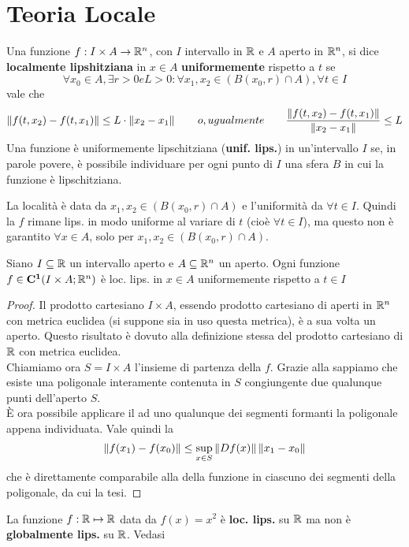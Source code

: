 \section{Teoria Locale}
\begin{definition}
	\label{def:loc_lips}
	Una funzione $f:I\times A\to \mathbb{R}^n$, con $I$ intervallo in $\mathbb{R}$ e $A$ aperto in $\mathbb{R}^n$, si dice \textbf{localmente lipshitziana} in $x\in A$ \textbf{uniformemente} rispetto a $t$ se
	$$\forall x_0 \in A, \exists r>0 e L>0: \forall x_1,x_2 \in (B(x_0,r)\cap A), \forall t\in I$$
	vale che
	$$\left\|f(t,x_2)-f(t,x_1)\right\|\leq L\cdot\left\|x_2-x_1\right\|\qquad o, ugualmente\qquad\frac{\left\|f(t,x_2)-f(t,x_1)\right\|}{\left\|x_2-x_1\right\|}\leq L$$
	Una funzione è uniformemente lipschitziana (\textbf{unif. lips.}) in un'intervallo $I$ se, in parole povere, è possibile individuare per ogni punto di $I$ una sfera $B$ in cui la funzione è lipschitziana.
\end{definition}
\begin{note}
	La località è data da $x_1,x_2 \in (B(x_0,r)\cap A)$ e l'uniformità da $\forall t\in I$. Quindi la $f$ rimane lips. in modo uniforme al variare di $t$ (cioè $\forall t\in I$), ma questo non è garantito $\forall x\in A$, solo per $x_1,x_2 \in (B(x_0,r)\cap A)$.
\end{note}
\begin{proposition}
	\label{prop:fc1_loc_lips}
	Siano $I\subseteq \mathbb{R}$ un intervallo aperto e $A\subseteq \mathbb{R}^n$ un aperto. Ogni funzione $f\in\mathbf{C^{1}}(I\times A;\mathbb{R}^n)$ è loc. lips. in $x\in A$ uniformemente rispetto a $t\in I$
	\begin{proof}
		Il prodotto cartesiano $I\times A$, essendo prodotto cartesiano di aperti in $\mathbb{R}^n$ con metrica euclidea (si suppone sia in uso questa metrica), è a sua volta un aperto. Questo risultato è dovuto alla definizione stessa del prodotto cartesiano di $\mathbb{R}$ con metrica euclidea.\\
		Chiamiamo ora $S=I\times A$ l'insieme di partenza della $f$. Grazie alla  sappiamo che esiste una poligonale interamente contenuta in $S$ congiungente due qualunque punti dell'aperto $S$.\\
		È ora possibile applicare il  ad uno qualunque dei segmenti formanti la poligonale appena individuata. Vale quindi la
		$$\left\|f(x_1)-f(x_0)\right\|\le \sup\limits_{x\in S}\left\|Df(x)\right\|\left\|x_1-x_0\right\|$$
		che è direttamente comparabile alla  della funzione in ciascuno dei segmenti della poligonale, da cui la tesi.
	\end{proof}
\end{proposition}
\begin{example}
	La funzione $f:\mathbb{R}\mapsto\mathbb{R}$ data da $f(x)=x^2$ è \textbf{loc. lips.} su $\mathbb{R}$ ma non è \textbf{globalmente lips.} su $\mathbb{R}$. Vedasi 
\end{example}

